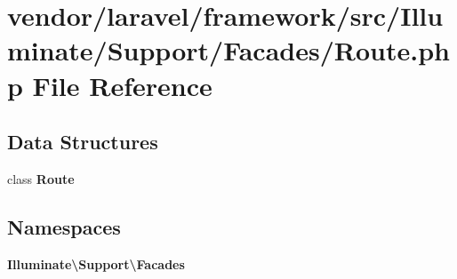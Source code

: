 \section{vendor/laravel/framework/src/\+Illuminate/\+Support/\+Facades/\+Route.php File Reference}
\label{laravel_2framework_2src_2_illuminate_2_support_2_facades_2_route_8php}
\subsection*{Data Structures}
\begin{DoxyCompactItemize}
\item 
class {\bf Route}
\end{DoxyCompactItemize}
\subsection*{Namespaces}
\begin{DoxyCompactItemize}
\item 
 {\bf Illuminate\textbackslash{}\+Support\textbackslash{}\+Facades}
\end{DoxyCompactItemize}
